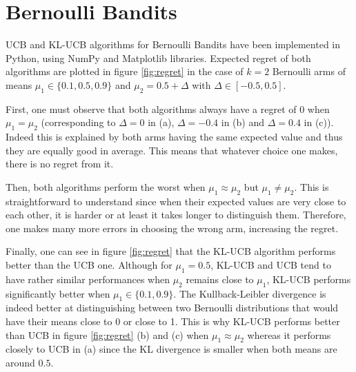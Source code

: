 \documentclass[a4paper]{article}
\begin{document}
\section{Bernoulli Bandits}
\label{sec:bernoulli}

UCB and KL-UCB algorithms for Bernoulli Bandits have been implemented in Python, using NumPy and Matplotlib libraries. Expected regret of both algorithms are plotted in figure \ref{fig:regret} in the case of $k=2$ Bernoulli arms of means $\mu_1 \in \{0.1,0.5,0.9\}$ and $\mu_2 = 0.5 + \Delta$ with $\Delta \in [-0.5,0.5]$.

First, one must observe that both algorithms always have a regret of $0$ when $\mu_1 = \mu_2$ (corresponding to $\Delta = 0$ in (a), $\Delta = -0.4$ in (b) and $\Delta = 0.4$ in (c)). Indeed this is explained by both arms having the same expected value and thus they are equally good in average. This means that whatever choice one makes, there is no regret from it.

Then, both algorithms perform the worst when $\mu_1 \approx \mu_2$ but $\mu_1 \neq \mu_2$. This is straightforward to understand since when their expected values are very close to each other, it is harder or at least it takes longer to distinguish them. Therefore, one makes many more errors in choosing the wrong arm, increasing the regret.

Finally, one can see in figure \ref{fig:regret} that the KL-UCB algorithm performs better than the UCB one. Although for $\mu_1 = 0.5$, KL-UCB and UCB tend to have rather similar performances when $\mu_2$ remains close to $\mu_1$, KL-UCB performs significantly better when $\mu_1 \in \{0.1,0.9\}$. The Kullback-Leibler divergence is indeed better at distinguishing between two Bernoulli distributions that would have their means close to 0 or close to 1. This is why KL-UCB performs better than UCB in figure \ref{fig:regret} (b) and (c) when $\mu_1 \approx \mu_2$ whereas it performs closely to UCB in (a) since the KL divergence is smaller when both means are around $0.5$.
\end{document}
